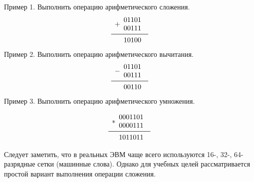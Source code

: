 \begin{center}

Пример 1. Выполнить операцию арифметического сложения.
\[
\begin{array}{r}
+
\begin{array}{r}
01101\\
00111\\
\end{array} \\
\midrule
\begin{array}{r}
10100
\end{array}
\end{array}
\]
Пример 2. Выполнить операцию арифметического вычитания.
\[
\begin{array}{r}
-
\begin{array}{r}
01101\\
00111\\
\end{array} \\
\midrule
\begin{array}{r}
00110
\end{array}
\end{array}
\]
Пример 3. Выполнить операцию арифметического умножения.

\[
\begin{array}{r}
*
\begin{array}{r}
0001101\\
0000111\\
\end{array} \\
\midrule
\begin{array}{r}
1011011
\end{array}
\end{array}
\]

\end{center}

Следует заметить, что в реальных ЭВМ чаще всего используются 16-, 32-, 64-разрядные сетки (машинные слова). Однако для учебных целей рассматривается простой вариант выполнения операции сложения.


